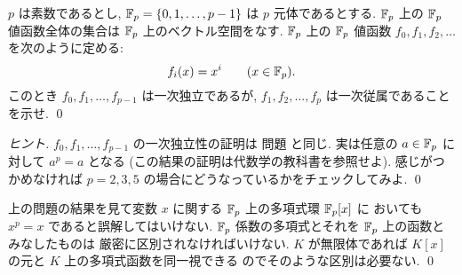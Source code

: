 \documentclass[12pt,twoside]{jarticle}
\begin{document}
\begin{question}[15点]
  $p$ は素数であるとし, ${\mathbb F}_p=\{0,1,\ldots,p-1\}$ は $p$ 元体であるとする.
  ${\mathbb F}_p$ 上の ${\mathbb F}_p$ 値函数全体の集合は ${\mathbb F}_p$ 上のベクトル空間をなす.
  ${\mathbb F}_p$ 上の ${\mathbb F}_p$ 値函数 $f_0,f_1,f_2,\ldots$ を次のように定める:
  \begin{equation*}
    f_i(x) = x^i \qquad (x\in{\mathbb F}_p).
  \end{equation*}
  このとき $f_0,f_1,\ldots,f_{p-1}$ は一次独立であるが, %
  $f_1,f_2,\ldots,f_p$ は一次従属であることを示せ.
  \qed
\end{question}

\begin{proof}[ヒント]
  $f_0,f_1,\ldots,f_{p-1}$ の一次独立性の証明は
  問題  と同じ.
  実は任意の $a\in{\mathbb F}_p$ に対して $a^p=a$ となる
  (この結果の証明は代数学の教科書を参照せよ).
  感じがつかめなければ $p=2,3,5$ の場合にどうなっているかをチェックしてみよ.
  \qed
\end{proof}

\begin{rem}
  上の問題の結果を見て変数 $x$ に関する ${\mathbb F}_p$ 上の多項式環 ${\mathbb F}_p[x]$ に
  おいても $x^p=x$ であると誤解してはいけない. 
  ${\mathbb F}_p$ 係数の多項式とそれを ${\mathbb F}_p$ 上の函数とみなしたものは
  厳密に区別されなければいけない.
  $K$ が無限体であれば $K[x]$ の元と $K$ 上の多項式函数を同一視できる
  のでそのような区別は必要ない.
  \qed
\end{rem}









\end{document}
